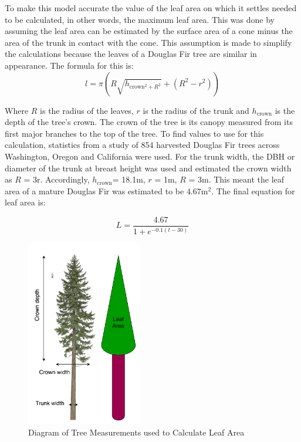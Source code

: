 \documentclass[twocolumn]{article} %
\begin{document}
To make this model accurate the value of the leaf area on which it settles needed to be calculated, in other words, the maximum leaf area. This was done by assuming the leaf area can be estimated by the surface area of a cone minus the area of the trunk in contact with the cone. This assumption is made to simplify the calculations because the leaves of a Douglas Fir tree are similar in appearance. The formula for this is:
\begin{equation}
\label{eq:seven}
    l = \pi (R \sqrt{h_{\text{crown}^2 + R^2}} + (R^2 - r^2))
\end{equation}


Where $R$ is the radius of the leaves, $r$ is the radius of the trunk and $h_\text{crown}$ is the depth of the tree’s crown. The crown of the tree is its canopy measured from its first major branches to the top of the tree. To find values to use for this calculation, statistics from a study of 854 harvested Douglas Fir trees across Washington, Oregon and California \cite{four} were used. For the trunk width, the DBH or diameter of the trunk at breast height was used and estimated the crown width as $R$ = 3r. Accordingly, $h_\text{crown}$= 18.1m, $r$ = 1m, $R$ = 3m. This meant the leaf area of a mature Douglas Fir was estimated  to be $4.67\text{m}^2$. The final equation for leaf area is:

\begin{equation}
\label{eq:eight}
    L = \frac{4.67}{1+e^{-0.1(t-30)}}
\end{equation}

\begin{figure}[htp]
    \centering
    \includegraphics[width=5cm]{Figures/Figure2}
    \caption{Diagram of Tree Measurements used to Calculate Leaf Area\cite{six}}
    \label{fig:treediagram}
\end{figure}
\end{document}
